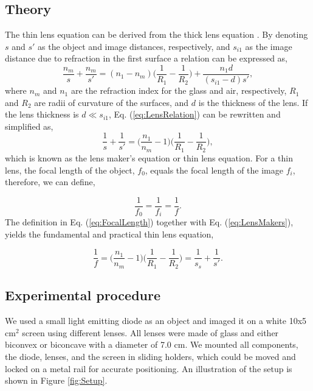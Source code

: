 \documentclass[fleqn,10pt]{SelfArx} %
\begin{document}
\subsection{Theory}
\noindent
The thin lens equation can be derived from the thick lens equation \cite{Pedrotti:Introduction}. By denoting $s$ and $s'$ as the object and image distances, respectively, and $s_{i1}$ as the image distance due to refraction in the first surface a relation can be expressed as, 
\begin{equation}
\label{eq:LensRelation}
\frac{n_{m}}{s}+\frac{n_{m}}{s'}=(n_{1}-n_{m})\bigg(\frac{1}{R_{1}}-\frac{1}{R_{2}}\bigg)+\frac{n_{1}d}{(s_{i1}-d)s'},
\end{equation}
where $n_{m}$ and $n_{1}$ are the refraction index for the glass and air, respectively, $R_{1}$ and $R_{2}$ are radii of curvature of the surfaces, and $d$ is the thickness of the lens. If the lens thickness is $d\ll s_{i1}$, Eq. (\ref{eq:LensRelation}) can be rewritten and simplified 
as,
\begin{equation}
\label{eq:LensMakers}
\frac{1}{s}+\frac{1}{s'}=\bigg(\frac{n_{1}}{n_{m}}-1\bigg)\bigg(\frac{1}{R_{1}}-\frac{1}{R_{2}}\bigg),
\end{equation}
which is known as the lens maker's equation or thin lens equation. For a thin lens, the focal length of the object, $f_{0}$, equals the focal length of the image $f_{i}$, therefore, we can define,

\begin{equation}
\label{eq:FocalLength}
\frac{1}{f_{0}}=\frac{1}{f_{i}}=\frac{1}{f}.
\end{equation}
The definition in Eq. (\ref{eq:FocalLength}) together with Eq. (\ref{eq:LensMakers}), yields the fundamental and practical thin lens equation,

\begin{equation}
\label{eq:ThinLens}
\frac{1}{f}=\bigg(\frac{n_{1}}{n_{m}}-1\bigg)\bigg(\frac{1}{R_{1}}-\frac{1}{R_{2}}\bigg)=\frac{1}{s_{s}}+\frac{1}{s'}.
\end{equation}

\subsection{Experimental procedure}
\noindent
We used a small light emitting diode as an object and imaged it on a white 10x5 cm$^2$ screen using different lenses. All lenses were made of glass and either biconvex or biconcave with a diameter of 7.0 cm. We mounted all components, the diode, lenses, and the screen in sliding holders, which could be moved and locked on a metal rail for accurate positioning. An illustration of the setup is shown in Figure \ref{fig:Setup}.
\end{document}
